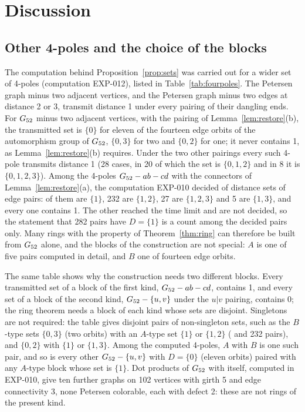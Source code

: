 \section{Discussion}\label{sec:discussion}

\subsection{Other 4-poles and the choice of the blocks}\label{sec:fourpoles}



The computation behind Proposition~\ref{prop:sets} was carried out for a wider set of 4-poles (computation EXP-012), listed in Table~\ref{tab:fourpoles}. The Petersen graph minus two adjacent vertices, and
the Petersen graph minus two edges at distance 2 or 3, transmit distance 1 under every pairing of
their dangling ends. For $G_{52}$ minus two adjacent vertices, with the pairing of
Lemma~\ref{lem:restore}(b), the transmitted set is $\{0\}$ for eleven of the fourteen edge orbits
of the automorphism group of $G_{52}$, $\{0, 3\}$ for two and $\{0, 2\}$ for one; it never contains
1, as Lemma~\ref{lem:restore}(b) requires. Under the two other pairings every such 4-pole
transmits distance 1 (28 cases, in 20 of which the set is $\{0,1,2\}$ and in 8 it is $\{0,1,2,3\}$). Among the 4-poles $G_{52} - ab - cd$ with the connectors of
Lemma~\ref{lem:restore}(a), the computation EXP-010 decided \nDistDecided{} of \nDistTotal{} distance sets of edge pairs: \nDistOne{} of them are $\{1\}$, 232 are $\{1,2\}$, 27 are
$\{1,2,3\}$ and 5 are $\{1,3\}$, and every one contains 1. The other \nDistUndecided{} reached the time limit and are not decided, so the statement that 282 pairs have $D = \{1\}$ is a count among
the decided pairs only. Many rings with the property of Theorem~\ref{thm:ring} can therefore be built from $G_{52}$ alone, and the blocks of the construction are not special:
$A$ is one of five pairs computed in detail, and $B$ one of fourteen edge orbits.

The same table shows why the construction needs two different blocks. Every transmitted set of a block of the first kind, $G_{52} - ab - cd$, contains 1, and
every set of a block of the second kind, $G_{52} - \{u, v\}$ under the $u|v$ pairing, contains 0; the ring theorem needs a block of each kind whose sets are
disjoint. Singletons are not required: the table gives disjoint pairs of non-singleton sets, such as the $B$-type sets $\{0,3\}$ (two orbits) with an $A$-type set $\{1\}$ or $\{1,2\}$
(\nDistOne{} and 232 pairs), and $\{0,2\}$ with $\{1\}$ or $\{1,3\}$. Among the computed 4-poles, $A$ with $B$ is one such pair, and so is every other
$G_{52} - \{u, v\}$ with $D = \{0\}$ (eleven orbits) paired with any $A$-type block whose set is $\{1\}$.
Dot products of $G_{52}$ with itself, computed in EXP-010, give ten further graphs on 102 vertices with girth 5 and edge connectivity 3, none Petersen colorable, each with defect 2:
these are not rings of the present kind.

